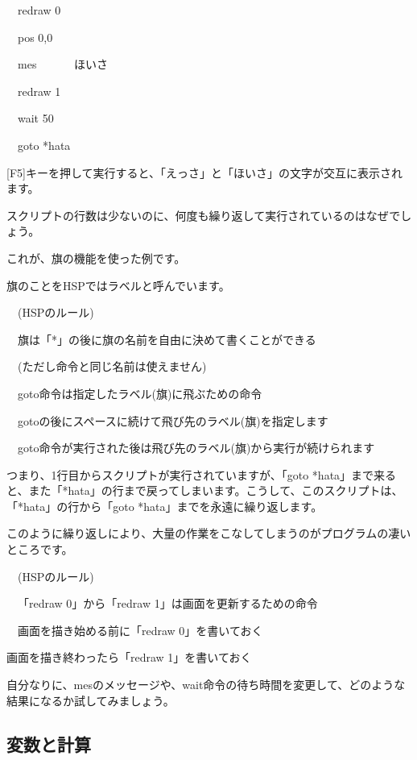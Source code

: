 \documentclass[a4paper,12pt]{jarticle}
\begin{document}
\ \ redraw 0

\ \ pos 0,0

\ \ mes {\textquotedbl}　　　ほいさ{\textquotedbl}

\ \ redraw 1

\ \ wait 50

\ \ goto *hata


\bigskip

[F5]キーを押して実行すると、「えっさ」と「ほいさ」の文字が交互に表示されます。

スクリプトの行数は少ないのに、何度も繰り返して実行されているのはなぜでしょう。

これが、旗の機能を使った例です。

旗のことをHSPではラベルと呼んでいます。


\bigskip

\ \ (HSPのルール)


\bigskip

\ \ 旗は「*」の後に旗の名前を自由に決めて書くことができる

\ \ (ただし命令と同じ名前は使えません)

\ \ goto命令は指定したラベル(旗)に飛ぶための命令

\ \ gotoの後にスペースに続けて飛び先のラベル(旗)を指定します

\ \ goto命令が実行された後は飛び先のラベル(旗)から実行が続けられます


\bigskip

つまり、1行目からスクリプトが実行されていますが、「goto
*hata」まで来ると、また「*hata」の行まで戻ってしまいます。こうして、このスクリプトは、「*hata」の行から「goto
*hata」までを永遠に繰り返します。

このように繰り返しにより、大量の作業をこなしてしまうのがプログラムの凄いところです。

\bigskip

\ \ (HSPのルール)

\bigskip

\ \ 「redraw 0」から「redraw
1」は画面を更新するための命令

\ \ 画面を描き始める前に「redraw
0」を書いておく

画面を描き終わったら「redraw
1」を書いておく


\bigskip

自分なりに、mesのメッセージや、wait命令の待ち時間を変更して、どのような結果になるか試してみましょう。

\bigskip
\bigskip


\subsection{変数と計算}
\bigskip
\bigskip
\end{document}
